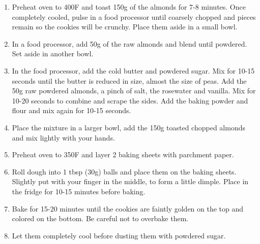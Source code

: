 \begin{enumerate}
    \item Preheat oven to 400\degree F and toast 150g of the almonds for 7-8 minutes. Once completely cooled, pulse in a food processor until coarsely chopped and pieces remain so the cookies will be crunchy. Place them aside in a small bowl.
    \item In a food processor, add 50g of the raw almonds and blend until powdered. Set aside in another bowl.
    \item In the food processor, add the cold butter and powdered sugar. Mix for 10-15 seconds until the butter is reduced in size, almost the size of peas. Add the 50g raw powdered almonds, a pinch of salt, the rosewater and vanilla. Mix for 10-20 seconds to combine and scrape the sides. Add the baking powder and flour and mix again for 10-15 seconds.
    \item Place the mixture in a larger bowl, add the 150g toasted  chopped almonds and mix lightly with your hands.
    \item Preheat oven to 350\degree F and layer 2 baking sheets with parchment paper.
    \item Roll dough into 1 tbsp (30g) balls and place them on the baking sheets. Slightly put with your finger in the middle, to form a little dimple. Place in the fridge for 10-15 minutes before baking.
    \item Bake for 15-20 minutes until the cookies are faintly golden on the top and colored on the bottom. Be careful not to overbake them.
    \item Let them completely cool before dusting them with powdered sugar.
\end{enumerate}